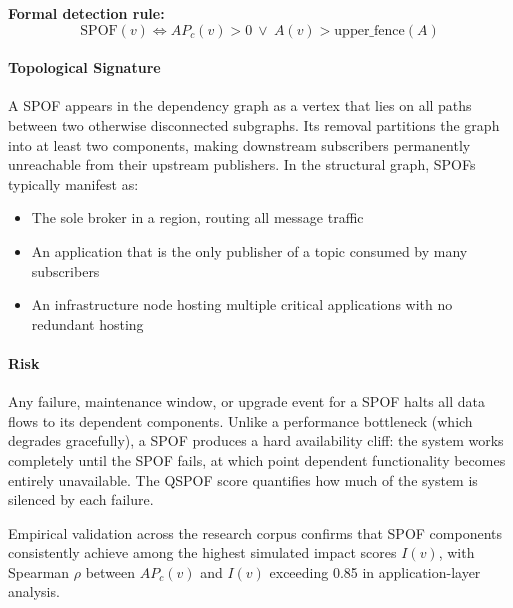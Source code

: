 \documentclass[11pt]{article}
\begin{document}
\noindent\textbf{Formal detection rule:}
\[
\mathrm{SPOF}(v) \Leftrightarrow AP_c(v) > 0 \ \lor\ A(v) > \text{upper\_fence}(A)
\]

\paragraph{Topological Signature}
A SPOF appears in the dependency graph as a vertex that lies on all paths between two otherwise disconnected subgraphs. Its removal partitions the graph into at least two components, making downstream subscribers permanently unreachable from their upstream publishers. In the structural graph, SPOFs typically manifest as:
\begin{itemize}[leftmargin=*]
\item The sole broker in a region, routing all message traffic
\item An application that is the only publisher of a topic consumed by many subscribers
\item An infrastructure node hosting multiple critical applications with no redundant hosting
\end{itemize}

\paragraph{Risk}
Any failure, maintenance window, or upgrade event for a SPOF halts all data flows to its dependent components. Unlike a performance bottleneck (which degrades gracefully), a SPOF produces a hard availability cliff: the system works completely until the SPOF fails, at which point dependent functionality becomes entirely unavailable. The QSPOF score quantifies how much of the system is silenced by each failure.

Empirical validation across the research corpus confirms that SPOF components consistently achieve among the highest simulated impact scores $I(v)$, with Spearman $\rho$ between $AP_c(v)$ and $I(v)$ exceeding 0.85 in application-layer analysis.
\end{document}
